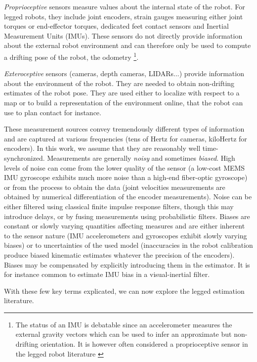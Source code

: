 \textit{Proprioceptive} sensors measure values about the internal state of the robot. For legged robots, they include joint encoders, strain gauges measuring 
either joint torques or end-effector torques, dedicated feet contact sensors and Inertial Measurement Units (IMUs). These sensors do not directly provide information
about the external robot environment and can therefore only be used to compute a drifting pose of the robot, the odometry \footnote{The status of an IMU is debatable
since an accelerometer measures the external gravity vectors which can be used to infer an approximate but non-drifting orientation. It is however often considered 
a proprioceptive sensor in the legged robot literature \cite{rotella2018unsupervised,scona2017direct,yang2019state,lin2021deep}}. 

\textit{Exteroceptive} sensors (cameras, depth cameras, LIDARs...) provide information about the environment of the robot.  
They are needed to obtain non-drifting estimates of the robot pose. 
They are used either to localize with respect to a map or to build a representation of the environment online, that the robot can use to plan contact for instance. 

These measurement sources convey tremendously different types of information and are captured at various frequencies (\eg tens of Hertz for cameras, kiloHertz for encoders). 
In this work, we assume that they are reasonably well time-synchronized. Measurements are generally \textit{noisy} and sometimes \textit{biased}. High levels of noise can 
come from the lower quality of the sensor (a low-cost MEMS IMU gyroscope exhibits much more noise than a high-end fiber-optic gyroscope) or from the process to obtain the
data (joint velocities measurements are obtained by numerical differentiation of the encoder measurements). Noise can be either filtered using classical finite impulse 
response filters, though this may introduce delays, or by fusing measurements using probabilistic filters. Biases are constant or slowly varying quantities affecting measures 
and are either inherent to the sensor nature (IMU accelerometers and gyroscopes exhibit slowly varying biases) or to uncertainties of the used model (inaccuracies
in the robot calibration produce biased kinematic estimates whatever the precision of the encoders). Biases may be compensated by explicitly introducing them in 
the estimator. It is for instance common to estimate IMU bias in a visual-inertial filter. 

With these few key terms explicated, we can now explore the legged estimation literature.


